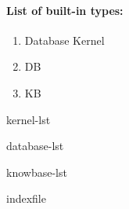 \paragraph{List of built-in types:}

\begin{enumerate}

\item{\eclipse Database Kernel}
\item{\eclipse DB}
\item{\eclipse KB}

\end{enumerate}

 {kernel-lst}

 {database-lst}

 {knowbase-lst}

\newpage
 {indexfile}
\newpage




